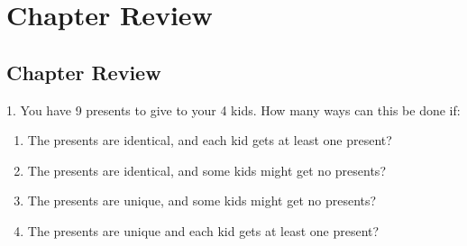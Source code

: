 \documentclass[10pt,]{book}
\theoremstyle{plain}
\theoremstyle{definition}
\numberwithin{equation}{chapter}
\begin{document}
\section[Chapter Review]{Chapter Review}\label{section-11}
\typeout{************************************************}
\typeout{************************************************}
\subsection[Chapter Review ]{Chapter Review }\label{exercises_count-conc}
\begin{exerciselist}
\item[1.]\hypertarget{exercise-120}{}
            You have 9 presents to give to your 4 kids. How many ways can this be done if:
          \leavevmode%
\begin{enumerate}[label=(\alph*)]
\item\hypertarget{li-366}{}
                The presents are identical, and each kid gets at least one present?
\item\hypertarget{li-367}{}
                The presents are identical, and some kids might get no presents?
\item\hypertarget{li-368}{}
                The presents are unique, and some kids might get no presents?
\item\hypertarget{li-369}{}
                The presents are unique and each kid gets at least one present?
\end{enumerate}


\end{exerciselist}
\end{document}
